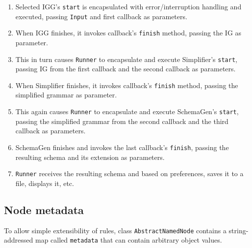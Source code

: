 \documentclass[a4paper,10pt,oneside]{article}
\newcommand{\code}[1]{\texttt{#1}}
\begin{document}
\begin{enumerate}
	\item Selected IGG's \code{start} is encapsulated with error/interruption handling and executed, passing \code{Input} and first callback as parameters.
	\item When IGG finishes, it invokes callback's \code{finish} method, passing the IG as parameter.
	\item This in turn causes \code{Runner} to encapsulate and execute Simplifier's \code{start}, passing IG from the first callback and the second callback as parameters.
	\item When Simplifier finishes, it invokes callback's \code{finish} method, passing the simplified grammar as parameter.
	\item This again causes \code{Runner} to encapsulate and execute SchemaGen's \code{start}, passing the simplified grammar from the second callback and the third callback as parameters.
	\item SchemaGen finishes and invokes the last callback's \code{finish}, passing the resulting schema and its extension as parameters.
	\item \code{Runner} receives the resulting schema and based on preferences, saves it to a file, displays it, etc.
\end{enumerate}

\subsection{Node metadata} \label{section_metadata}
To allow simple extensibility of rules, class \code{AbstractNamedNode} contains a string-addressed map called \code{metadata} that can contain arbitrary object values.
\end{document}
